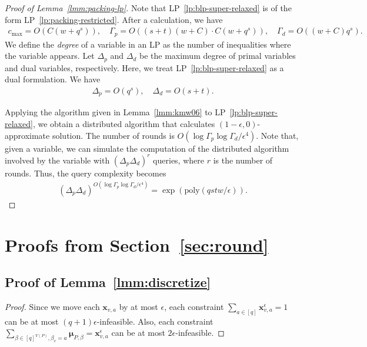 \documentclass[letterpaper, 11pt]{article}
\newcommand{\bix}{\boldsymbol{x}}
\newcommand{\bimu}{\boldsymbol{\mu}}
\newcommand{\poly}{\mathrm{poly}}
\begin{document}
\begin{proof}[Proof of Lemma~\ref{lmm:packing-lp}]
  Note that LP~\eqref{lp:blp-super-relaxed} is of the form LP~\eqref{lp:packing-restricted}.
  After a calculation, we have
  \begin{eqnarray*}
    c_{\max}  = O(C(w+q^s)), 
    \quad
    \Gamma_p  = O((s+t)(w+C)\cdot C(w+q^s)),  
    \quad
    \Gamma_d  = O((w+C)q^s).
  \end{eqnarray*}
  We define the \textit{degree} of a variable in an LP as the number of inequalities where the variable appears.
  Let $\Delta_p$ and $\Delta_d$ be the maximum degree of primal variables and dual variables, respectively.
  Here, we treat LP~\eqref{lp:blp-super-relaxed} as a dual formulation.
  We have
  \begin{eqnarray*}
    \Delta_p  = O(q^s),  
    \quad
    \Delta_d  = O(s+t).
  \end{eqnarray*}

  Applying the algorithm given in Lemma~\ref{lmm:kmw06} to LP~\eqref{lp:blp-super-relaxed},
  we obtain a distributed algorithm that calculates $(1-\epsilon,0)$-approximate solution.
  The number of rounds is $O(\log \Gamma_p\log \Gamma_d/\epsilon^4)$.
  Note that,
  given a variable,
  we can simulate the computation of the distributed algorithm involved by the variable with $(\Delta_p\Delta_d)^r$ queries,
  where $r$ is the number of rounds.
  Thus, the query complexity becomes
  \begin{eqnarray*}
    (\Delta_p\Delta_d)^{O(\log \Gamma_p\log \Gamma_d/\epsilon^4)}
    =
    \exp(\poly(qstw/\epsilon)).
  \end{eqnarray*}
\end{proof}

\section{Proofs from Section~\ref{sec:round}}\label{apx:round-appendix}
\subsection{Proof of Lemma~\ref{lmm:discretize}}
\begin{proof}
  Since we move each $\bix_{v,a}$ by at most $\epsilon$,
  each constraint $\sum_{a\in [q]} \bix^\epsilon_{v,a}=1$ can be at most $(q+1)\epsilon$-infeasible.
  Also, each constraint $\sum_{\beta\in [q]^{V(P)},\beta_v=a} \bimu_{P,\beta}=\bix^\epsilon_{v,a}$ can be at most $2\epsilon$-infeasible.
\end{proof}
\end{document}
